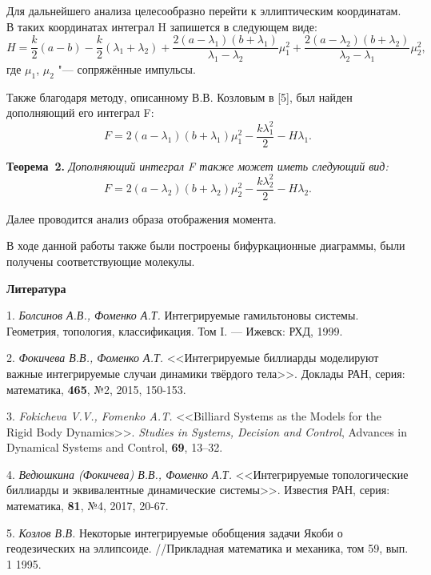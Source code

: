 Для дальнейшего анализа целесообразно перейти к эллиптическим координатам. В таких координатах интеграл H запишется в следующем виде:
$$H=\frac{k}{2}(a-b)-\frac{k}{2}(\lambda_1+\lambda_2)+\frac{2(a-\lambda_1)(b+\lambda_1)}{\lambda_1-\lambda_2}\mu_1^2+\frac{2(a-\lambda_2)(b+\lambda_2)}{\lambda_2-\lambda_1}\mu_2^2,$$
где $\mu_1$, $\mu_2$ "--- сопряжённые импульсы.

Также благодаря методу, описанному В.В. Козловым в [5], был найден дополняющий его интеграл F:
$$F=2(a-\lambda_1)(b+\lambda_1)\mu_1^2-\frac{k\lambda_1^2}{2}-H\lambda_1.$$

\textbf{Теорема~2.} {\it Дополняющий интеграл F также может иметь следующий вид:
$$F=2(a-\lambda_2)(b+\lambda_2)\mu_2^2-\frac{k\lambda_2^2}{2}-H\lambda_2.$$}

Далее проводится анализ образа отображения момента.

В ходе данной работы также были построены бифуркационные диаграммы, были получены соответствующие молекулы.

\smallskip \centerline {\bf Литература} \nopagebreak

1. {\it Болсинов А.В., Фоменко А.Т.} Интегрируемые гамильтоновы системы. Геометрия, топология, классификация. Том I. — Ижевск: РХД, 1999.

2. {\it Фокичева В.В., Фоменко А.Т.} <<Интегрируемые биллиарды моделируют важные интегрируемые случаи динамики твёрдого тела>>. Доклады РАН, серия: математика, {\bf 465}, №2, 2015, 150-153.

3. {\it Fokicheva V.V., Fomenko A.T.} <<Billiard Systems as the Models for the Rigid
Body Dynamics>>. {\it Studies in Systems, Decision and Control}, Advances in Dynamical
Systems and Control, {\bf 69}, 13–32.

4. {\it Ведюшкина (Фокичева) В.В., Фоменко А.Т.} <<Интегрируемые топологические биллиарды и эквивалентные динамические системы>>. Известия РАН, серия: математика, {\bf 81}, №4, 2017, 20-67.

5. {\it Козлов В.В.} Некоторые интегрируемые обобщения задачи Якоби о геодезических на эллипсоиде. //Прикладная математика и механика, том 59, вып. 1 1995.
